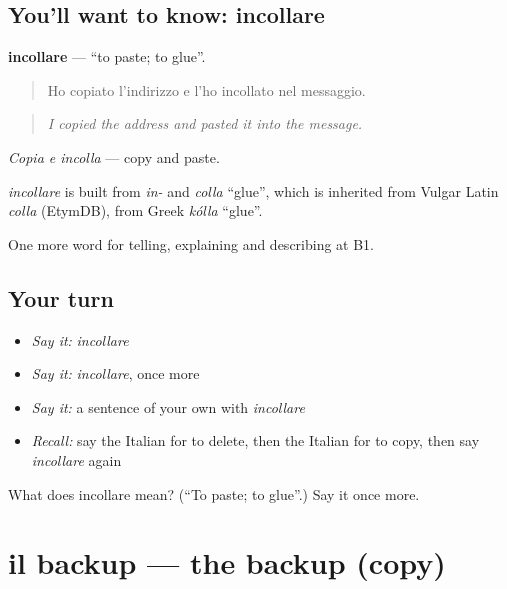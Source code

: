 \subsection*{You'll want to know: incollare}
\textbf{incollare} — \textquotedblleft{}to paste; to glue\textquotedblright{}.

\begin{quote}
Ho copiato l'indirizzo e l'ho incollato nel messaggio.
\end{quote}

\begin{quote}
\emph{I copied the address and pasted it into the message.}
\end{quote}

\emph{Copia e incolla} — copy and paste.

\begin{cousinweb}
\emph{incollare} is built from \emph{in-} and \emph{colla} \textquotedblleft{}glue\textquotedblright{}, which is inherited from Vulgar Latin \emph{colla} (EtymDB), from Greek \emph{kólla} \textquotedblleft{}glue\textquotedblright{}.
\end{cousinweb}

\begin{grammarlens}[title={What you've built}]
One more word for telling, explaining and describing at B1.
\end{grammarlens}

\subsection*{Your turn}
\begin{itemize}
\raggedright
  \item \emph{Say it:} \emph{incollare}
  \item \emph{Say it:} \emph{incollare}, once more
  \item \emph{Say it:} a sentence of your own with \emph{incollare}
  \item \emph{Recall:} say the Italian for to delete, then the Italian for to copy, then say \emph{incollare} again
\end{itemize}

\begin{tcolorbox}[breakable,colback=teal!4,colframe=teal!35!black,title={Before you move on}]
What does incollare mean? (\textquotedblleft{}To paste; to glue\textquotedblright{}.) Say it once more.
\end{tcolorbox}
\section[il backup]{il backup — the backup (copy)}

